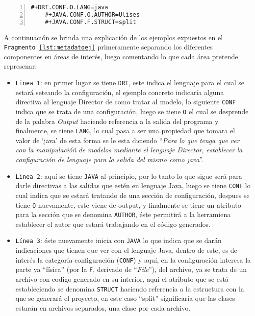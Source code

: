 \begin{lstlisting}[caption={Director - Metadatos ejemplos}, numbers=left,
label=lst:metadatoej]
	#+DRT.CONF.O.LANG=java
	#+JAVA.CONF.O.AUTHOR=Ulises
	#+JAVA.CONF.F.STRUCT=split
\end{lstlisting}

A continuación se brinda una explicación de los ejemplos expuestos en el
\texttt{Fragmento \ref{lst:metadatoej}} primeramente separando los diferentes
componentes	en áreas de interés, luego comentando lo que cada área pretende
represenar:

\begin{itemize}
	\item \texttt{Linea 1}: en primer lugar se tiene \texttt{DRT}, este indica el
		lenguaje para el cual se estará seteando la configuración, el ejemplo
		concreto indicaría alguna directiva al lenguaje Director de como tratar al
		modelo, lo siguiente \texttt{CONF} indica que se trata de una
		configuración, luego se tiene \texttt{O} el cual se desprende de la palabra
		\textit{Output} haciendo referencia a la salida del programa y finalmente,
		se tiene \texttt{LANG}, lo cual pasa a ser una propiedad que tomara el
		valor de `java' de esta forma se le esta diciendo ``\textit{Para lo que
		tenga que ver con la manipulacióñ de modelos mediante el lenguaje Director,
		establecer la configuración de lenguaje para la salida del mismo como
		java}''.
	\item \texttt{Linea 2}: aquí se tiene \texttt{JAVA} al principio, por lo
		tanto lo que sigue será para darle directivas a las salidas que estén en
		lenguaje Java, luego se tiene \texttt{CONF} lo cual indica que se estará
		tratando de una sección de configuración, despues se tiene \texttt{O}
		nuevamente, este viene de output, y finalmente se tiene un atributo para la
		sección que se denomina \texttt{AUTHOR}, éste permitirá a la herramiena
		establecer el autor que estará trabajando en el código generados.
	\item \texttt{Línea 3}: éste nuevamente inicia con \texttt{JAVA} lo que
		indica que se darán indicaciones que tienen que ver con el lenguaje Java,
		dentro de este, es de interés la categoría configuración (\texttt{CONF}) y
		aquí, en la configuración interesa la parte ya ``física'' (por la
		\texttt{F}, derivado de ``\textit{File}''), del archivo, ya
		se trata de un archivo con codigo generado en su interior, aquí el atributo
		que se está estableciendo se denomina \texttt{STRUCT} haciendo referencia a
		la estructura con la que se generará el proyecto, en este caso ``split''
		significaría que las clases estarán en archivos separados, una clase por
		cada archivo.
\end{itemize}


